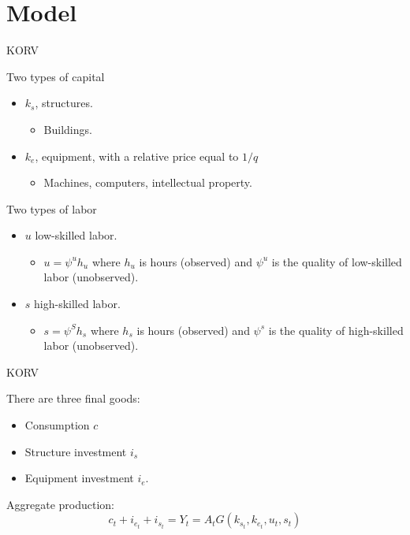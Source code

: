 \documentclass[notes,11pt, aspectratio=169]{beamer}
\newenvironment{wideitemize}{\itemize\addtolength{\itemsep}{10pt}}{\enditemize}
\begin{document}
\section{Model}
\begin{frame}{KORV}
 \begin{wideitemize}
 \item Two types of capital
 \begin{itemize}
 \item $k_s$, structures.
 \begin{itemize}
 \item Buildings.
 \end{itemize}
 \item $k_e$, equipment, with a relative price equal to $1/q$
 \begin{itemize}
 \item Machines, computers, intellectual property.
 \end{itemize}
 \end{itemize}
 \item Two types of labor
 \begin{itemize}
 \item $u$ low-skilled labor.
 \begin{itemize}
 \item $u= \psi^u h_u$ where $h_u$ is hours (observed) and $\psi^u$ is the quality of low-skilled labor (unobserved). 
 \end{itemize}
 \item $s$ high-skilled labor.
 \begin{itemize}
 \item $s = \psi^S h_s$ where $h_s$ is hours (observed) and $\psi^s$ is the quality of high-skilled labor (unobserved). 
 \end{itemize}
 \end{itemize}
\end{wideitemize}
\end{frame}

\begin{frame}{KORV}
 \begin{wideitemize}
 \item There are three final goods:
 \begin{itemize}
 \item Consumption $c$
 \item Structure investment $i_s$
 \item Equipment investment $i_e$.
 \end{itemize}
 \item Aggregate production:
 \begin{equation}\label{eq:production}
 c_t + i_{e_t} + i_{s_t} = Y_t = A_t G(k_{s_t}, k_{e_t}, u_t, s_t)
 \end{equation}
 \end{wideitemize}
\end{frame}
\end{document}
